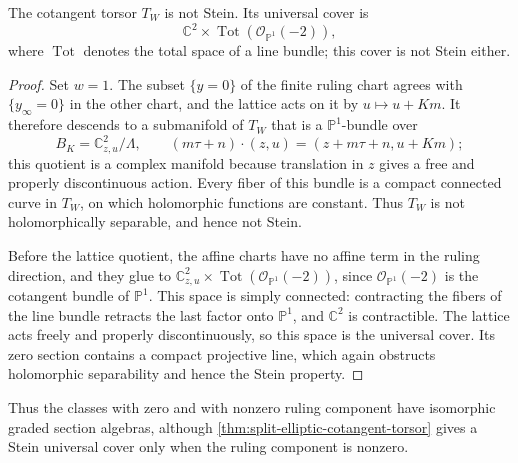\begin{proposition}\label{prop:elliptic-zero-ruling-torsor-cover}
The cotangent torsor $T_W$ is not Stein. Its universal cover is
\[
 \mathbb C^2\times\operatorname{Tot}
                      (\mathcal O_{\mathbb P^1}(-2)),
\]
where $\operatorname{Tot}$ denotes the total space of a line bundle; this cover is not Stein either.
\end{proposition}
\begin{proof}
Set $w=1$. The subset $\{y=0\}$ of the finite ruling chart agrees with $\{y_\infty=0\}$ in the other chart, and the lattice acts on it by $u\mapsto u+Km$. It therefore descends to a submanifold of $T_W$ that is a $\mathbb P^1$-bundle over
\[
 B_K=\mathbb C^2_{z,u}/\Lambda,\qquad
 (m\tau+n)\cdot(z,u)=(z+m\tau+n,u+Km);
\]
this quotient is a complex manifold because translation in $z$ gives a free and properly discontinuous action. Every fiber of this bundle is a compact connected curve in $T_W$, on which holomorphic functions are constant. Thus $T_W$ is not holomorphically separable, and hence not Stein.

Before the lattice quotient, the affine charts have no affine term in the ruling direction, and they glue to $\mathbb C^2_{z,u}\times\operatorname{Tot}(\mathcal O_{\mathbb P^1}(-2))$, since $\mathcal O_{\mathbb P^1}(-2)$ is the cotangent bundle of $\mathbb P^1$. This space is simply connected: contracting the fibers of the line bundle retracts the last factor onto $\mathbb P^1$, and $\mathbb C^2$ is contractible. The lattice acts freely and properly discontinuously, so this space is the universal cover. Its zero section contains a compact projective line, which again obstructs holomorphic separability and hence the Stein property.
\end{proof}

Thus the classes with zero and with nonzero ruling component have isomorphic graded section algebras, although \cref{thm:split-elliptic-cotangent-torsor} gives a Stein universal cover only when the ruling component is nonzero.

\par\endgroup
